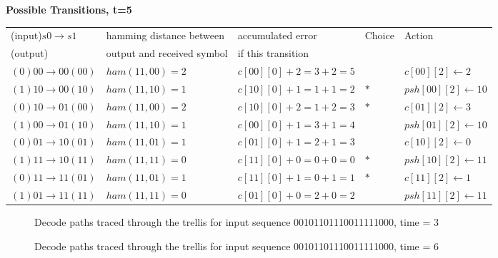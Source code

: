 \begin{table}
\textbf{Possible Transitions, t=5}
\begin{tabular}{l|l|l|l|l}
(input)$s0 \rightarrow s1$ & hamming distance between   & accumulated error  & Choice & Action \\
              (output)     & output and received symbol & if this transition &        &        \\
\hline
$(0) 00\rightarrow00 (00)$ & $ham(11, 00) = 2$ & $c[00][0] + 2 = 3 + 2 = 5$ &     & $c[00][2] \leftarrow 2$ \\
$(1) 10\rightarrow00 (10)$ & $ham(11, 10) = 1$ & $c[10][0] + 1 = 1 + 1 = 2$ & $*$ & $psh[00][2] \leftarrow 10$ \\
\hline
$(0) 10\rightarrow01 (00)$ & $ham(11, 00) = 2$ & $c[10][0] + 2 = 1 + 2 = 3$ & $*$ & $c[01][2] \leftarrow 3$ \\
$(1) 00\rightarrow01 (10)$ & $ham(11, 10) = 1$ & $c[00][0] + 1 = 3 + 1 = 4$ &     & $psh[01][2] \leftarrow 10$ \\
\hline
$(0) 01\rightarrow10 (01)$ & $ham(11, 01) = 1$ & $c[01][0] + 1 = 2 + 1 = 3$ &     & $c[10][2] \leftarrow 0$ \\
$(1) 11\rightarrow10 (11)$ & $ham(11, 11) = 0$ & $c[11][0] + 0 = 0 + 0 = 0$ & $*$ & $psh[10][2] \leftarrow 11$ \\
\hline
$(0) 11\rightarrow11 (01)$ & $ham(11, 01) = 1$ & $c[11][0] + 1 = 0 + 1 = 1$ & $*$ & $c[11][2] \leftarrow 1$ \\
$(1) 01\rightarrow11 (11)$ & $ham(11, 11) = 0$ & $c[01][0] + 0 = 2 + 0 = 2$ &     & $psh[11][2] \leftarrow 11$ \\
\end{tabular}
\label{tbl:trellis-decode}
\end{table}


\begin{figure}
\center
\epsfxsize=5.5in
\caption{Path traced through the trellis for input sequence 00101101110011111000, time = 1}

\epsfxsize=5.5in
\caption{Decode paths traced through the trellis for input sequence 00101101110011111000, time = 2}

\epsfxsize=5.5in
\caption{Decode paths traced through the trellis for input sequence 00101101110011111000, time = 3}
\label{fig:trellis-decode-1}
\end{figure}

\begin{figure}
\center
\epsfxsize=5.5in
\caption{Decode paths traced through the trellis for input sequence 00101101110011111000, time = 4}

\epsfxsize=5.5in
\caption{Decode paths traced through the trellis for input sequence 00101101110011111000, time = 5}

\epsfxsize=5.5in
\caption{Decode paths traced through the trellis for input sequence 00101101110011111000, time = 6}

\label{fig:trellis-decode-2}
\end{figure}


